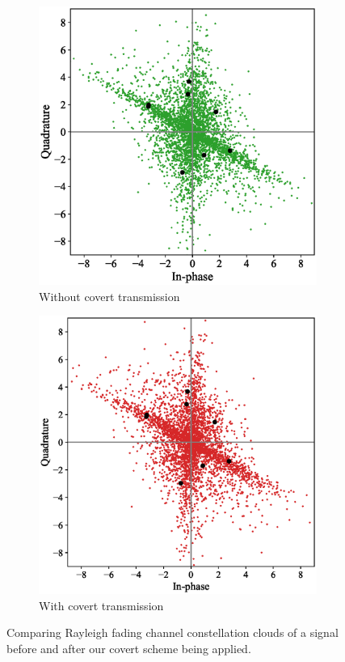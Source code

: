 \begin{figure}[bp!]
	\begin{subfigure}{0.24\textwidth}
		\includegraphics[width=\linewidth]{figs/rayleigh_normal_constellation}
		\caption{Without covert transmission}
	\end{subfigure}
	\hfill
	\begin{subfigure}{0.24\textwidth}
		\includegraphics[width=\linewidth]{figs/rayleigh_covert_constellation}
		\caption{With covert transmission}	
	\end{subfigure}
	\caption{Comparing Rayleigh fading channel constellation clouds of a signal before and after our covert scheme being applied.}
	\label{fig:rayleigh_constellation}
\end{figure}

